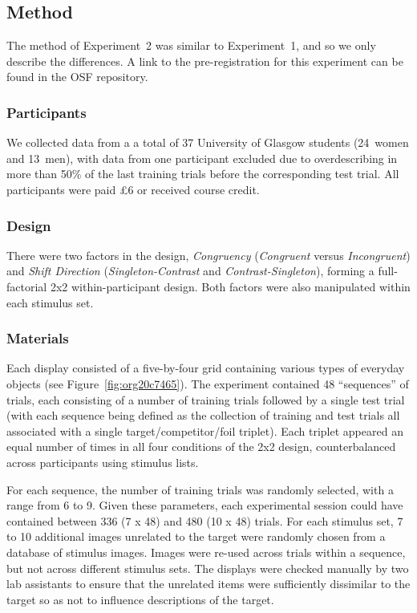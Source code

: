 \documentclass[natbib,doc,a4paper]{apa6}
\begin{document}
\subsection*{Method}
\label{sec:org2cac929}

The method of Experiment~2 was similar to Experiment~1, and so we only describe the differences. A link to the pre-registration for this experiment can be found in the OSF repository.

\subsubsection*{Participants}
\label{sec:orgc35ef47}

We collected data from a a total of 37 University of Glasgow students (24~women and 13~men), with data from one participant excluded due to overdescribing in more than 50\% of the last training trials before the corresponding test trial. All participants were paid £6 or received course credit.

\subsubsection*{Design}
\label{sec:org3aa7d3b}

There were two factors in the design, \emph{Congruency} (\emph{Congruent} versus \emph{Incongruent}) and \emph{Shift Direction} (\emph{Singleton-Contrast} and \emph{Contrast-Singleton}), forming a full-factorial 2x2 within-participant design.  Both factors were also manipulated within each stimulus set.

\subsubsection*{Materials}
\label{sec:org3b4047e}

Each display consisted of a five-by-four grid containing various types of everyday objects (see Figure~\ref{fig:org20c7465}). The experiment contained 48 ``sequences'' of trials, each consisting of a number of training trials followed by a single test trial (with each sequence being defined as the collection of training and test trials all associated with a single target/competitor/foil triplet). Each triplet appeared an equal number of times in all four conditions of the 2x2 design, counterbalanced across participants using stimulus lists.

For each sequence, the number of training trials was randomly selected, with a range from 6 to 9. Given these parameters, each experimental session could have contained between 336 (7 x 48) and 480 (10 x 48) trials. For each stimulus set, 7 to 10 additional images unrelated to the target were randomly chosen from a database of stimulus images. Images were re-used across trials within a sequence, but not across different stimulus sets. The displays were checked manually by two lab assistants to ensure that the unrelated items were sufficiently dissimilar to the target so as not to influence descriptions of the target.
\end{document}
